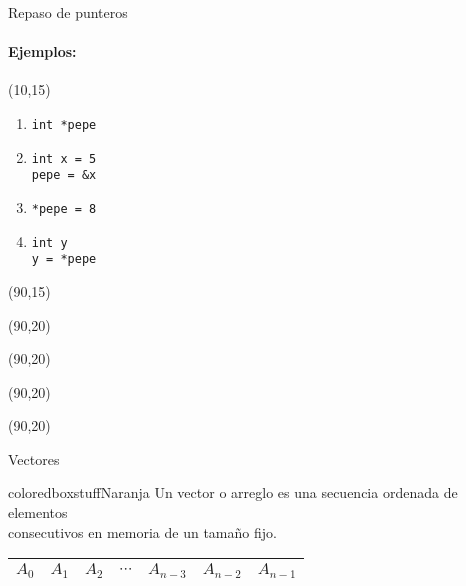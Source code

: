 \documentclass[aspectratio=169]{beamer}
\begin{document}
\begin{frame}[fragile]{Repaso de punteros}
    \framesubtitle{Ejemplos:}
    \begin{textblock}{50}(10,15)
    \begin{enumerate}
    \setlength\itemsep{1.5em}
    \Large
    \item \verb|int *pepe|
    \vskip 0.3cm
    \item \verb|int x = 5|\\
    \verb|pepe = &x|
    \vskip 0.3cm
    \item \verb|*pepe = 8|
    \vskip 0.3cm
    \item \verb|int y|\\
    \verb|y = *pepe|
    \vskip 0.3cm
    \end{enumerate}
    \end{textblock}
    \begin{textblock}{50}(90,15)
    \end{textblock}
    \begin{textblock}{50}(90,20)  \end{textblock}
    \begin{textblock}{50}(90,20)  \end{textblock}
    \begin{textblock}{50}(90,20)  \end{textblock}
    \begin{textblock}{50}(90,20)  \end{textblock}
\end{frame}

\begin{frame}[fragile]{Vectores}
    \begin{beamercolorbox}[wd=1\textwidth,sep=1em]{coloredboxstuffNaranja}
    \centering \large
    Un vector o arreglo es una secuencia ordenada de elementos\\ consecutivos en memoria de un tamaño fijo.
    \end{beamercolorbox}
    \bigskip
    \begin{center}
    \large
    \begin{tabular}{|c|c|c|c|c|c|c|}
     \hline
     $A_0$ & $A_1$ & $A_2$ & $\cdots$ & $A_{n-3}$ & $A_{n-2}$ & $A_{n-1}$ \\
     \hline
    \end{tabular}
    \end{center}
\end{frame}
\end{document}
